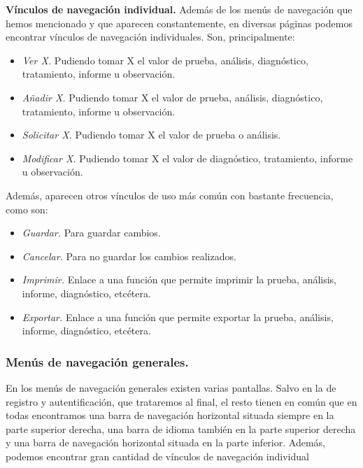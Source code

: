 		\textbf{Vínculos de navegación individual.} Además de los menús de navegación que hemos mencionado y que aparecen constantemente, en diversas páginas podemos encontrar vínculos de navegación individuales. Son, principalmente:
		\begin{itemize}
			\item \textit{Ver X.} Pudiendo tomar X el valor de prueba, análisis, diagnóstico, tratamiento, informe u observación.
			\item \textit{Añadir X.}  Pudiendo tomar X el valor de prueba, análisis, diagnóstico, tratamiento, informe u observación.
			\item \textit{Solicitar X.}  Pudiendo tomar X el valor de prueba o análisis.
			\item \textit{Modificar X.} Pudiendo tomar X el valor de diagnóstico, tratamiento, informe u observación.			
		\end{itemize}
		
		Además, aparecen otros vínculos de uso más común con bastante frecuencia, como son:
		\begin{itemize}
			\item \textit{Guardar.} Para guardar cambios.
			\item \textit{Cancelar.} Para no guardar los cambios realizados.
			\item \textit{Imprimir.} Enlace a una función que permite imprimir la prueba, análisis, informe, diagnóstico, etcétera. 
			\item \textit{Exportar.} Enlace a una función que permite exportar la prueba, análisis, informe, diagnóstico, etcétera.
		\end{itemize}
		
		
		\newpage
		\subsubsection{Menús de navegación generales.} %
		\label{par:nav_menus_de_navegacion_generales}
		
		En los menús de navegación generales existen varias pantallas. Salvo en la de registro y autentificación, que trataremos al final, el resto tienen en común que en todas encontramos una barra de navegación horizontal situada siempre en la parte superior derecha, una barra de idioma también en la parte superior derecha y una barra de navegación horizontal situada en la parte inferior. Además, podemos encontrar gran cantidad de vínculos de navegación individual
		
